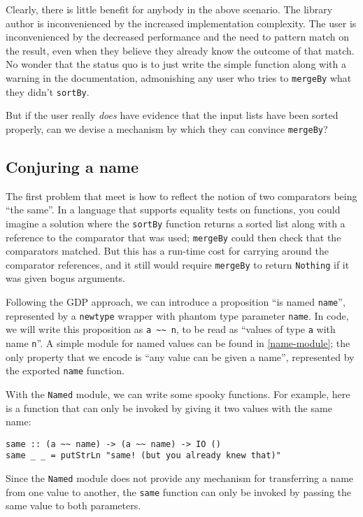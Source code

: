 \documentclass[format=sigplan, review=false, screen=true]{acmart}
\begin{document}
Clearly, there is little benefit for anybody in the above scenario. The
library author is inconvenienced by the increased implementation complexity.
The user is inconvenienced by the decreased performance and the need to
pattern match on the result, even when they believe they already know the
outcome of that match. No wonder that the status quo is to just write
the simple function along with a warning in the documentation, admonishing
any user who tries to \texttt{mergeBy} what they didn't \texttt{sortBy}.

But if the user really \emph{does} have evidence that the input lists have
been sorted properly, can we devise a mechanism by which they can convince
\texttt{mergeBy}?

\subsection{Conjuring a name}
The first problem that meet is how to reflect the notion of two  comparators
being ``the same''. In a language that supports equality tests on functions,
you could imagine a solution where the \texttt{sortBy} function returns a sorted
list along with a reference to the comparator that was used; \texttt{mergeBy} could
then check that the comparators matched. But this has a run-time cost for carrying
around the comparator references, and it still would require \texttt{mergeBy} to
return \texttt{Nothing} if it was given bogus arguments.

Following the GDP approach, we can introduce a proposition ``is named \texttt{name}'',
represented by a \texttt{newtype} wrapper with phantom type parameter \texttt{name}.
In code, we will write this proposition as \verb|a ~~ n|, to be read as
``values of type \texttt{a} with name \texttt{n}''. A simple module for named values
can be found in \cref{name-module}; the only property that we encode is
``any value can be given a name'', represented by the exported \texttt{name} function.

With the \texttt{Named} module, we can write some spooky functions. For example,
here is a function that can only be invoked by giving it two values with the same
name:
\begin{verbatim}
same :: (a ~~ name) -> (a ~~ name) -> IO ()
same _ _ = putStrLn "same! (but you already knew that)"
\end{verbatim}
Since the \texttt{Named} module does not provide any mechanism for transferring
a name from one value to another, the \texttt{same} function can only be invoked
by passing the same value to both parameters.
\end{document}
